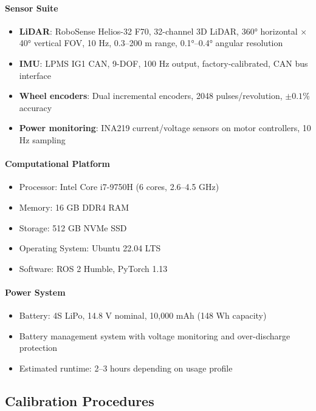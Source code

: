 \paragraph{Sensor Suite}
\begin{itemize}
    \item \textbf{LiDAR}: RoboSense Helios-32 F70, 32-channel 3D LiDAR, 360° horizontal × 40° vertical FOV, 10 Hz, 0.3--200 m range, 0.1°--0.4° angular resolution
    \item \textbf{IMU}: LPMS IG1 CAN, 9-DOF, 100 Hz output, factory-calibrated, CAN bus interface
    \item \textbf{Wheel encoders}: Dual incremental encoders, 2048 pulses/revolution, $\pm 0.1$\% accuracy
    \item \textbf{Power monitoring}: INA219 current/voltage sensors on motor controllers, 10 Hz sampling
\end{itemize}

\paragraph{Computational Platform}
\begin{itemize}
    \item Processor: Intel Core i7-9750H (6 cores, 2.6--4.5 GHz)
    \item Memory: 16 GB DDR4 RAM
    \item Storage: 512 GB NVMe SSD
    \item Operating System: Ubuntu 22.04 LTS
    \item Software: ROS 2 Humble, PyTorch 1.13
\end{itemize}

\paragraph{Power System}
\begin{itemize}
    \item Battery: 4S LiPo, 14.8 V nominal, 10,000 mAh (148 Wh capacity)
    \item Battery management system with voltage monitoring and over-discharge protection
    \item Estimated runtime: 2--3 hours depending on usage profile
\end{itemize}


\subsection{Calibration Procedures}

